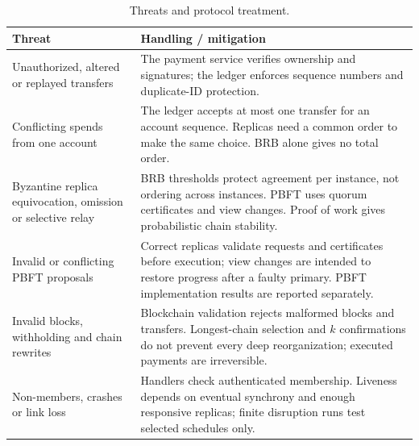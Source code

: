 \documentclass[sigconf,a4paper]{acmart}
\begin{document}
    \begin{table}[t]
        \centering
        \scriptsize
        \setlength{\tabcolsep}{3pt}
        \renewcommand{\arraystretch}{1.05}
        \caption{Threats and protocol treatment.}
        \label{tab:threats}
        \begin{tabular}{>{\raggedright\arraybackslash}p{2.05cm}>{\raggedright\arraybackslash}p{5.25cm}}
            \toprule
            \textbf{Threat} & \textbf{Handling / mitigation} \\
            \midrule
            Unauthorized, altered or replayed transfers
            & The payment service verifies ownership and signatures; the ledger enforces sequence numbers and duplicate-ID protection. \\
            \addlinespace
            Conflicting spends from one account
            & The ledger accepts at most one transfer for an account sequence. Replicas need a common order to make the same choice. BRB alone gives no total order. \\
            \addlinespace
            Byzantine replica equivocation, omission or selective relay
            & BRB thresholds protect agreement per instance, not ordering across instances. PBFT uses quorum certificates and view changes. Proof of work gives probabilistic chain stability. \\
            \addlinespace
            Invalid or conflicting PBFT proposals
            & Correct replicas validate requests and certificates before execution; view changes are intended to restore progress after a faulty primary. PBFT implementation results are reported separately. \\
            \addlinespace
            Invalid blocks, withholding and chain rewrites
            & Blockchain validation rejects malformed blocks and transfers. Longest-chain selection and $k$ confirmations do not prevent every deep reorganization; executed payments are irreversible. \\
            \addlinespace
            Non-members, crashes or link loss
            & Handlers check authenticated membership. Liveness depends on eventual synchrony and enough responsive replicas; finite disruption runs test selected schedules only. \\
            \bottomrule
        \end{tabular}
    \end{table}



\end{document}
